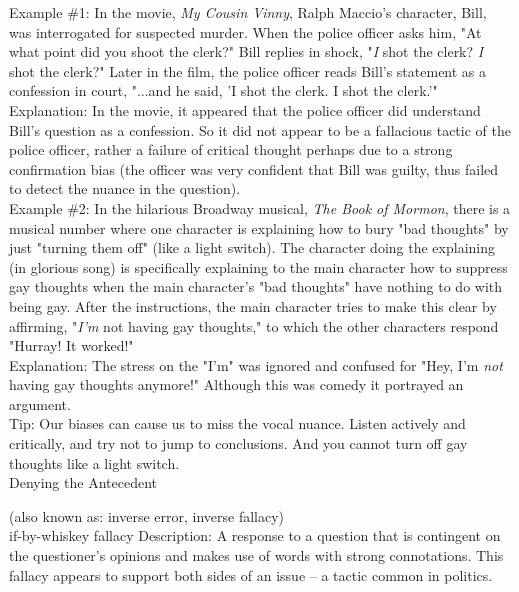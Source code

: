 \documentclass[a4paper,12pt,single,pdftex]{scrbook}
\begin{document}
    
      Example \#1: In the movie, {\it My Cousin Vinny}, Ralph Maccio's character, Bill, was interrogated for suspected murder. When the police officer asks him, "At what point did you shoot the clerk?" Bill replies in shock, "{\em I} shot the clerk? {\em I} shot the clerk?" Later in the film, the police officer reads Bill's statement as a confession in court, "...and he said, 'I shot the clerk. I shot the clerk.'"
    \\

    
      Explanation: In the movie, it appeared that the police officer did understand Bill's question as a confession. So it did not appear to be a fallacious tactic of the police officer, rather a failure of critical thought perhaps due to a strong confirmation bias (the officer was very confident that Bill was guilty, thus failed to detect the nuance in the question).
    \\

    
      Example \#2: In the hilarious Broadway musical, {\it The Book of Mormon}, there is a musical number where one character is explaining how to bury "bad thoughts" by just "turning them off" (like a light switch). The character doing the explaining (in glorious song) is specifically explaining to the main character how to suppress gay thoughts when the main character's "bad thoughts" have nothing to do with being gay. After the instructions, the main character tries to make this clear by affirming, "{\it I'm} not having gay thoughts," to which the other characters respond "Hurray! It worked!"
    \\

    
      Explanation: The stress on the "I'm" was ignored and confused for "Hey, I'm {\it not} having gay thoughts anymore!" Although this was comedy it portrayed an argument.
    \\

    
      Tip: Our biases can cause us to miss the vocal nuance. Listen actively and critically, and try not to jump to conclusions. And you cannot turn off gay thoughts like a light switch.
    \\

  

Denying the Antecedent
    
      (also known as: inverse error, inverse fallacy)
    \\

  

if-by-whiskey fallacy
    Description: A response to a question that is contingent on the questioner’s opinions and makes use of words with strong connotations.  This fallacy appears to support both sides of an issue -- a tactic common in politics.
\end{document}
